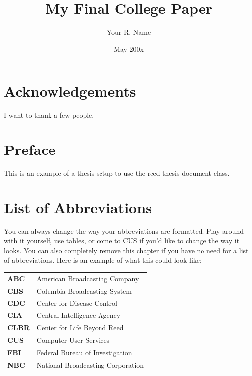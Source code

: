 \documentclass[
    12pt,
    twoside,
    bibstyle=ieee,
    headerstyle=uppercase
]{reedthesis}
\title{My Final College Paper}
\author{Your R. Name}
\date{May 200x}
\begin{document}
  \maketitle
  \frontmatter %
  \pagestyle{empty} %

    \chapter*{Acknowledgements}
	I want to thank a few people.

    \chapter*{Preface}
	This is an example of a thesis setup to use the reed thesis document class.
	
	

    \chapter*{List of Abbreviations}
		You can always change the way your abbreviations are formatted. Play around with it yourself, use tables, or come to CUS if you'd like to change the way it looks. You can also completely remove this chapter if you have no need for a list of abbreviations. Here is an example of what this could look like:

	\begin{table}[h]
	\centering %
	\begin{tabular}{ll}
		\textbf{ABC}  	&  American Broadcasting Company \\
		\textbf{CBS}  	&  Columbia Broadcasting System\\
		\textbf{CDC}  	&  Center for Disease Control \\
		\textbf{CIA}  	&  Central Intelligence Agency\\
		\textbf{CLBR} 	&  Center for Life Beyond Reed\\
		\textbf{CUS}  	&  Computer User Services\\
		\textbf{FBI}  	&  Federal Bureau of Investigation\\
		\textbf{NBC}  	&  National Broadcasting Corporation\\
	\end{tabular}
	\end{table}
	
\end{document}
